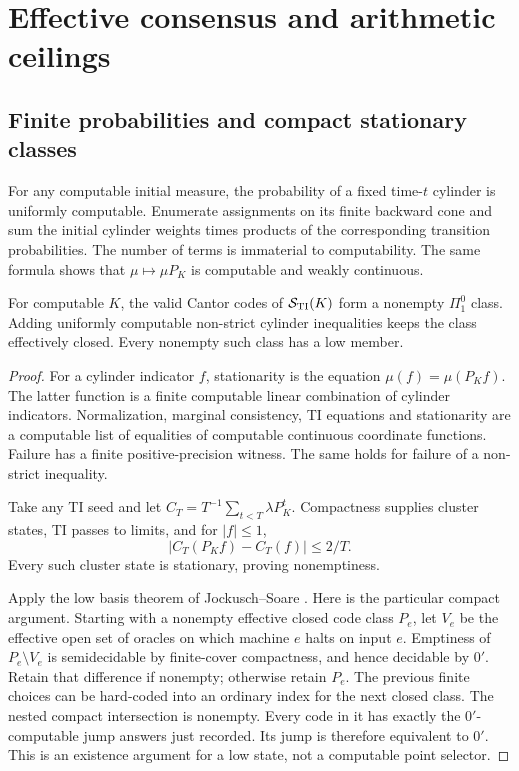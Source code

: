 \section{Effective consensus and arithmetic ceilings}\label{sec:consensus}
\subsection{Finite probabilities and compact stationary classes}
For any computable initial measure, the probability of a fixed
time-$t$ cylinder is uniformly computable. Enumerate assignments
on its finite backward cone and sum the initial cylinder weights
times products of the corresponding transition probabilities.
The number of terms is immaterial to computability. The same formula
shows that $\mu\mapsto\mu P_K$ is computable and weakly continuous.

\begin{lemma}\label{lem:stationary}
For computable $K$, the valid Cantor codes of $\mathcal S_{\rm TI}(K)$ form a
nonempty $\Pi^0_1$ class. Adding uniformly computable non-strict
cylinder inequalities keeps the class effectively closed.
Every nonempty such class has a low member.
\end{lemma}
\begin{proof}
For a cylinder indicator $f$, stationarity is the equation
$\mu(f)=\mu(P_Kf)$. The latter function is a finite computable
linear combination of cylinder indicators. Normalization,
marginal consistency, TI equations and stationarity are a
computable list of equalities of computable continuous coordinate
functions. Failure has a finite positive-precision witness.
The same holds for failure of a non-strict inequality.

Take any TI seed and let
$C_T=T^{-1}\sum_{t<T}\lambda P_K^t$. Compactness supplies cluster
states, TI passes to limits, and for $|f|\leq1$,
\begin{equation}\label{eq:cesaro-residual}
 |C_T(P_Kf)-C_T(f)|\leq 2/T.
\end{equation}
Every such cluster state is stationary, proving nonemptiness.

Apply the low basis theorem of Jockusch--Soare \cite{lowbasis}.
Here is the particular compact argument. Starting with a nonempty
effective closed code class $P_e$, let $V_e$ be the effective open
set of oracles on which machine $e$ halts on input $e$. Emptiness
of $P_e\setminus V_e$ is semidecidable by finite-cover compactness,
and hence decidable by $0'$. Retain that difference if nonempty;
otherwise retain $P_e$. The previous finite choices can be
hard-coded into an ordinary index for the next closed class.
The nested compact intersection is nonempty. Every code in it
has exactly the $0'$-computable jump answers just recorded.
Its jump is therefore equivalent to $0'$. This is an existence
argument for a low state, not a computable point selector.
\end{proof}

